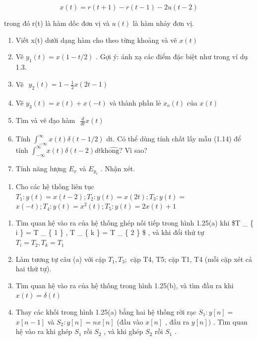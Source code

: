 \documentclass[
  10
]{article}
\providecommand{\tightlist}{%
  \setlength{\itemsep}{0pt}\setlength{\parskip}{0pt}}
\begin{document}
\[
x (t) = r (t + 1) - r (t - 1) - 2 u (t - 2)
\]

trong đó r(t) là hàm dốc đơn vị và \(u ( t )\) là hàm nhảy đơn vị.

\begin{enumerate}
\def\labelenumi{(\alph{enumi})}
\item
  Viết x(t) dưới dạng hàm cho theo từng khoảng và vẽ \(x ( t )\)
\item
  Vẽ \(y _ { 1 } ( t ) = x ( 1 - t / 2 )\) . Gợi ý: ánh xạ các điểm đặc
  biệt như trong ví dụ 1.3.
\item
  Vẽ
  \(\begin{array} { r } { y _ { 2 } ( t ) = 1 - \frac { 1 } { 2 } x ( 2 t - 1 ) } \end{array}\)
\item
  Vẽ \(y _ { 3 } ( t ) = x ( t ) + x ( - t )\) và thành phần lẻ
  \(x _ { o } ( t )\) của \(x ( t )\)
\item
  Tìm và vẽ đạo hàm
  \(\begin{array} { r } { \frac { d } { d t } x ( t ) } \end{array}\)
\item
  Tính
  \(\textstyle \int _ { - \infty } ^ { \infty } x ( t ) \delta ( t - 1 / 2 )\)
  dt. Có thể dùng tính chất lấy mẫu (1.14) để tính
  \(\textstyle \int _ { - \infty } ^ { \infty } x ( t ) \delta ( t - 2 ) d t \mathrm { k h } \hat { \mathrm { o n g } } ?\)
  Vì sao?
\item
  Tính năng lượng \(E _ { x }\) và \(E _ { y _ { 1 } }\) . Nhận xét.
\end{enumerate}

\begin{enumerate}
\def\labelenumi{\arabic{enumi}.}
\setcounter{enumi}{7}
\tightlist
\item
  Cho các hệ thống liên tục
  \(T _ { 1 } : y ( t ) = x ( t - 2 ) ; T _ { 2 } : y ( t ) = x ( 2 t ) ; T _ { 3 } : y ( t ) =\)
  \(x ( - t ) ; T _ { 4 } : y ( t ) = x ^ { 2 } ( t ) ; T _ { 5 } : y ( t ) = 2 x ( t ) + 1\)
\end{enumerate}

\begin{enumerate}
\def\labelenumi{(\alph{enumi})}
\item
  Tìm quan hệ vào ra của hệ thống ghép nối tiếp trong hình 1.25(a) khi
  \$T \_ \{ i \} = T \_ \{ 1 \} , T \_ \{ k \} = T \_ \{ 2 \} \$ , và
  khi đổi thứ tự \(T _ { i } = T _ { 2 } , T _ { k } = T _ { 1 }\)
\item
  Làm tương tự câu (a) với cặp \(T _ { 1 } , T _ { 3 } ;\) cặp T4, T5;
  cặp T1, T4 (mỗi cặp xét cả hai thứ tự).
\item
  Tìm quan hệ vào ra của hệ thống trong hình 1.25(b), và tìm đầu ra khi
  \(x ( t ) = \delta ( t )\)
\item
  Thay các khối trong hình 1.25(a) bằng hai hệ thống rời rạc
  \(S _ { 1 } : y [ n ] =\) \(x [ n - 1 ]\) và
  \(S _ { 2 } : y [ n ] = n x [ n ]\) (đầu vào \(x [ n ]\) , đầu ra
  \(y [ n ] )\) . Tìm quan hệ vào ra khi ghép \(S _ { 1 }\) rồi
  \(S _ { 2 }\) , và khi ghép \(S _ { 2 }\) rồi \(S _ { 1 }\) .
\end{enumerate}
\end{document}

